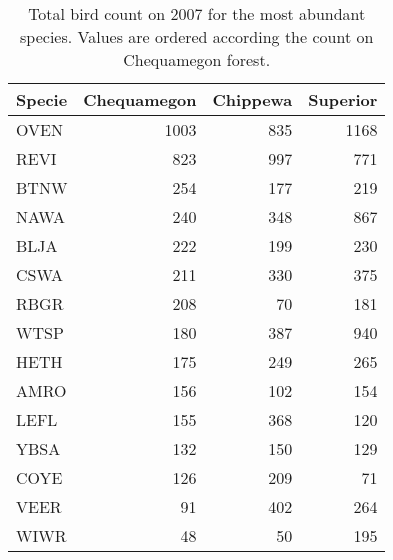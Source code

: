 \begin{table}[ht]
\begin{center}
\begin{tabular}{lrrr}
  \hline
Specie & Chequamegon & Chippewa & Superior \\ 
  \hline
OVEN & 1003 & 835 & 1168 \\ 
  REVI & 823 & 997 & 771 \\ 
  BTNW & 254 & 177 & 219 \\ 
  NAWA & 240 & 348 & 867 \\ 
  BLJA & 222 & 199 & 230 \\ 
  CSWA & 211 & 330 & 375 \\ 
  RBGR & 208 &  70 & 181 \\ 
  WTSP & 180 & 387 & 940 \\ 
  HETH & 175 & 249 & 265 \\ 
  AMRO & 156 & 102 & 154 \\ 
  LEFL & 155 & 368 & 120 \\ 
  YBSA & 132 & 150 & 129 \\ 
  COYE & 126 & 209 &  71 \\ 
  VEER &  91 & 402 & 264 \\ 
  WIWR &  48 &  50 & 195 \\ 
   \hline
\end{tabular}
\caption{Total bird count on 2007 for the most 
             abundant species. Values are ordered according the count on Chequamegon forest.}
\label{t1}
\end{center}
\end{table}
